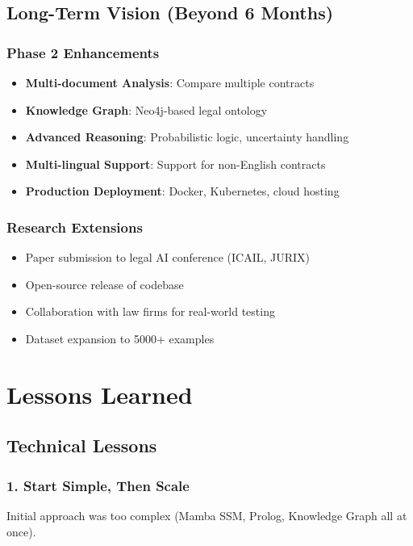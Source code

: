 \documentclass[12pt,a4paper]{article}
\begin{document}
\subsection{Long-Term Vision (Beyond 6 Months)}

\subsubsection{Phase 2 Enhancements}
\begin{itemize}
    \item \textbf{Multi-document Analysis}: Compare multiple contracts
    \item \textbf{Knowledge Graph}: Neo4j-based legal ontology
    \item \textbf{Advanced Reasoning}: Probabilistic logic, uncertainty handling
    \item \textbf{Multi-lingual Support}: Support for non-English contracts
    \item \textbf{Production Deployment}: Docker, Kubernetes, cloud hosting
\end{itemize}

\subsubsection{Research Extensions}
\begin{itemize}
    \item Paper submission to legal AI conference (ICAIL, JURIX)
    \item Open-source release of codebase
    \item Collaboration with law firms for real-world testing
    \item Dataset expansion to 5000+ examples
\end{itemize}

\newpage

\section{Lessons Learned}

\subsection{Technical Lessons}

\subsubsection{1. Start Simple, Then Scale}
Initial approach was too complex (Mamba SSM, Prolog, Knowledge Graph all at once). 
\end{document}
